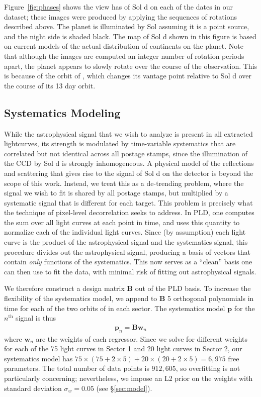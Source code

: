 \documentclass[modern]{aastex62}
\begin{document}
Figure~\ref{fig:phases} shows the view \TESS has of Sol d on each of the dates
in our dataset; these images were produced by applying the sequences of rotations
described above. The planet is illuminated by Sol assuming it is a point source,
and the night side is shaded black. The map of Sol d shown in this figure is 
based on current models of the actual distribution of continents on the planet.
Note that although the images are computed an integer number of rotation periods
apart, the planet appears to slowly rotate over the course of the observation.
This is because of the orbit of \TESS, which changes its vantage point relative
to Sol d over the course of its 13 day orbit.

\subsection{Systematics Modeling}
\label{sec:systematics}

While the astrophysical signal that we wish to analyze is present in all 
extracted lightcurves, its strength is modulated by time-variable systematics 
that are correlated but not identical across all postage stamps, since the
illumination of the CCD by Sol d is strongly inhomogeneous. A physical
model of the reflections and scattering that gives rise to the
signal of Sol d on the \TESS detector is beyond the scope of this work. Instead,
we treat this as a de-trending problem, where the signal we wish to fit is
shared by all postage stamps, but multiplied by a systematic signal that is
different for each target. This problem is precisely what the technique of
pixel-level decorrelation \citep[PLD;][]{Deming2015, Luger2016, Luger2018a}
seeks to address. In PLD, one computes the sum over all light curves at each
point in time, and uses this quantity to normalize each of the individual
light curves. Since (by assumption) each light curve is the product of the astrophysical
signal and the systematics signal, this procedure divides out the astrophysical
signal, producing a basis of vectors that contain \emph{only} functions of the
systematics. This now serves as a ``clean'' basis one can then use to fit the
data, with minimal risk of fitting out astrophysical signals.

We therefore construct a design matrix $\mathbf{B}$ out of the PLD basis. To
increase the flexibility of the systematics model, we append to $\mathbf{B}$ 5 orthogonal
polynomials in time for each of the two orbits of \TESS in each sector.
The systematics model $\mathbf{p}$ for the $n^\mathrm{th}$ signal is thus
%
\begin{align}
\mathbf{p}_n = \mathbf{B} \mathbf{w}_n
\end{align}
%
where $\mathbf{w}_n$ are the weights of each regressor.
Since we solve for different weights for each of the 75 light curves in Sector 1
and 20 light curves in Sector 2, our systematics model has
$75 \times (75 + 2 \times 5) + 20 \times (20 + 2 \times 5) = 6,975$ free parameters.
The total number of data points is $912,605$, so overfitting is not particularly
concerning; nevertheless, we impose an L2 prior on the weights with
standard deviation $\sigma_w = 0.05$ (see \S\ref{sec:model}).
\end{document}
